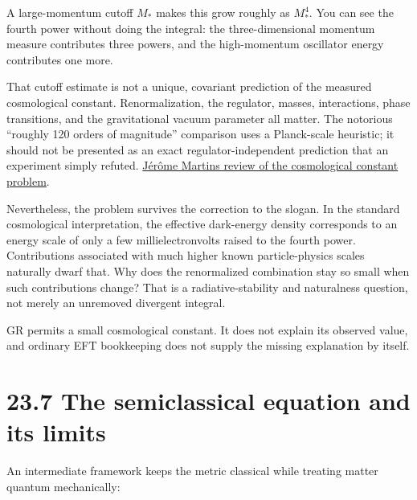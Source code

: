 \documentclass[
  11pt,
  letterpaper,
  oneside,
  openany]{scrbook}
\begin{document}
A large-momentum cutoff \(M_*\) makes this grow roughly as \(M_*^4\).
You can see the fourth power without doing the integral: the
three-dimensional momentum measure contributes three powers, and the
high-momentum oscillator energy contributes one more.

That cutoff estimate is not a unique, covariant prediction of the
measured cosmological constant. Renormalization, the regulator, masses,
interactions, phase transitions, and the gravitational vacuum parameter
all matter. The notorious ``roughly 120 orders of magnitude'' comparison
uses a Planck-scale heuristic; it should not be presented as an exact
regulator-independent prediction that an experiment simply refuted.
\href{https://arxiv.org/abs/1205.3365}{Jérôme Martin\textquotesingle s
review of the cosmological constant problem}.

Nevertheless, the problem survives the correction to the slogan. In the
standard cosmological interpretation, the effective dark-energy density
corresponds to an energy scale of only a few millielectronvolts raised
to the fourth power. Contributions associated with much higher known
particle-physics scales naturally dwarf that. Why does the renormalized
combination stay so small when such contributions change? That is a
radiative-stability and naturalness question, not merely an unremoved
divergent integral.

GR permits a small cosmological constant. It does not explain its
observed value, and ordinary EFT bookkeeping does not supply the missing
explanation by itself.

\hypertarget{the-semiclassical-equation-and-its-limits}{%
\section{23.7 The semiclassical equation and its
limits}\label{the-semiclassical-equation-and-its-limits}}

An intermediate framework keeps the metric classical while treating
matter quantum mechanically:

\begin{center}
\begingroup
{}
\ifdim\wd\grmathbox>\linewidth
\resizebox{\linewidth}{!}{\usebox{\grmathbox}}
\else\usebox{\grmathbox}\fi
\endgroup
\end{center}
\end{document}
